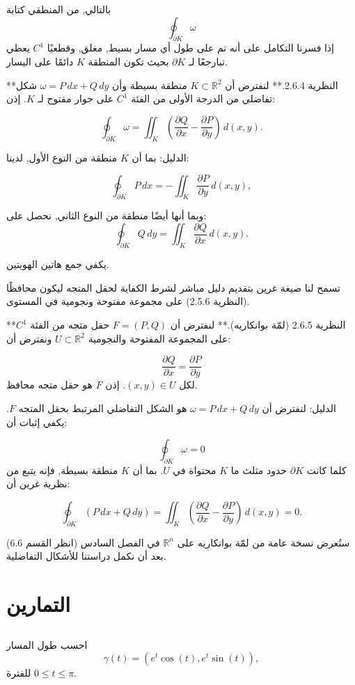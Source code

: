 بالتالي, من المنطقي كتابة
\[ \oint_{\partial K} \omega \]
إذا فسرنا التكامل على أنه تم على طول أي مسار بسيط, مغلق, وقطعيًا \( C^1 \) يعطي تبارجعًا لـ \( \partial K \) بحيث تكون المنطقة \( K \) دائمًا على اليسار.

**النظرية 2.6.4.** لنفترض أن \( K \subset \mathbb{R}^2 \) منطقة بسيطة وأن \( \omega = P \, dx + Q \, dy \) شكل تفاضلي من الدرجة الأولى من الفئة \( C^1 \) على جوار مفتوح لـ \( K \). إذن:

\[
\oint_{\partial K} \omega = \iint_K \left( \frac{\partial Q}{\partial x} - \frac{\partial P}{\partial y} \right) \, d(x, y).
\]

الدليل: بما أن \( K \) منطقة من النوع الأول, لدينا:

\[ 
\oint_{\partial K} P \, dx = -\iint_K \frac{\partial P}{\partial y} \, d(x, y), 
\]

وبما أنها أيضًا منطقة من النوع الثاني, نحصل على:
\[ 
\oint_{\partial K} Q \, dy = \iint_K \frac{\partial Q}{\partial x} \, d(x, y). 
\]

يكفي جمع هاتين الهويتين.

تسمح لنا صيغة غرين بتقديم دليل مباشر لشرط الكفاية لحقل المتجه ليكون محافظًا (النظرية 2.5.6) على مجموعة مفتوحة ونجومية في المستوى.


**النظرية 2.6.5 (لمّة بوانكاريه).** لنفترض أن \( F = (P, Q) \) حقل متجه من الفئة \( C^1 \) على المجموعة المفتوحة والنجومية \( U \subset \mathbb{R}^2 \) ونفترض أن:

\[ \frac{\partial Q}{\partial x} = \frac{\partial P}{\partial y} \]
لكل \( (x, y) \in U \). إذن \( F \) هو حقل متجه محافظ.

الدليل: لنفترض أن \( \omega = P \, dx + Q \, dy \) هو الشكل التفاضلي المرتبط بحقل المتجه \( F \). يكفي إثبات أن:


\[ \oint_{\partial K} \omega = 0 \]
كلما كانت \( \partial K \) حدود مثلث ما \( K \) محتواة في \( U \). بما أن \( K \) منطقة بسيطة, فإنه يتبع من نظرية غرين أن:

\[ \oint_{\partial K} (P \, dx + Q \, dy) = \iint_K \left( \frac{\partial Q}{\partial x} - \frac{\partial P}{\partial y} \right) \, d(x, y) = 0. \]

ستُعرض نسخة عامة من لمّة بوانكاريه على \( \mathbb{R}^n \) في الفصل السادس (انظر القسم 6.6) بعد أن نكمل دراستنا للأشكال التفاضلية.
\newpage

\section{التمارين}
\subsection{}
احسب طول المسار
\[ \gamma(t) = (e^t \cos(t), e^t \sin(t)), \]
للفترة \( 0 \leq t \leq \pi \).
